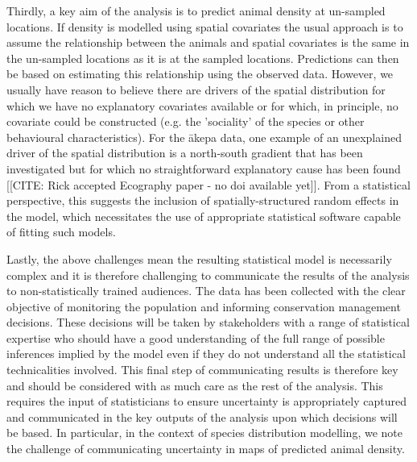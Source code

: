 \documentclass[preprint,12pt]{elsarticle}
\newcommand{\akepa}{\textquotesingle\={a}kepa}  %
\begin{document}
Thirdly, a key aim of the analysis is to predict animal density at un-sampled locations.  If density is modelled using spatial covariates the usual approach is to assume the relationship between the animals and spatial covariates is the same in the un-sampled locations as it is at the sampled locations.  Predictions can then be based on estimating this relationship using the observed data.  However, we usually have reason to believe there are drivers of the spatial distribution for which we have no explanatory covariates available or for which, in principle, no covariate could be constructed (e.g. the 'sociality' of the species or other behavioural characteristics).  For the \akepa{} data, one example of an unexplained driver of the spatial distribution is a north-south gradient that has been investigated but for which no straightforward explanatory cause has been found [[CITE: Rick accepted Ecography paper - no doi available yet]].  From a statistical perspective, this suggests the inclusion of spatially-structured random effects in the model, which necessitates the use of appropriate statistical software capable of fitting such models.

Lastly, the above challenges mean the resulting statistical model is necessarily complex and it is therefore challenging to communicate the results of the analysis to non-statistically trained audiences.  The data has been collected with the clear objective of monitoring the population and informing conservation management decisions.  These decisions will be taken by stakeholders with a range of statistical expertise who should have a good understanding of the full range of possible inferences implied by the model even if they do not understand all the statistical technicalities involved.  This final step of communicating results is therefore key and should be considered with as much care as the rest of the analysis.  This requires the input of statisticians to ensure uncertainty is appropriately captured and communicated in the key outputs of the analysis upon which decisions will be based.  In particular, in the context of species distribution modelling, we note the challenge of communicating uncertainty in maps of predicted animal density.
\end{document}
